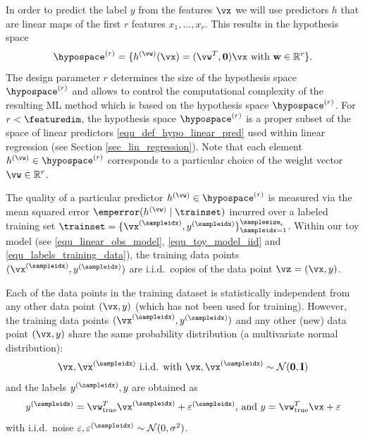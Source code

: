\documentclass[12pt]{report}
\begin{document}
In order to predict the label $y$ from the features $\vx$ we will use 
predictors $h$ that are linear maps of the first $r$ features $x_{1},\ldots,x_{r}$. 
This results in the hypothesis space 
\vspace*{-2mm}
\begin{equation}
\label{equ_generalization_hypospace_r}
\hypospace^{(r)} = \{ h^{(\vw)}(\vx)= (\vw^{T},\mathbf{0}) \vx \mbox{ with } \mathbf{w} \in \mathbb{R}^{r} \}.   
\vspace*{-1mm}
\end{equation}
The design parameter $r$ determines the size of the hypothesis space 
$\hypospace^{(r)}$ and allows to control the computational complexity 
of the resulting ML method which is based on the hypothesis space 
$\hypospace^{(r)}$. For $r < \featuredim$, the hypothesis space $\hypospace^{(r)}$ 
is a proper subset of the space of linear predictors \eqref{equ_def_hypo_linear_pred} 
used within linear regression (see Section \ref{sec_lin_regression}). Note that 
each element $h^{(\vw)} \in \hypospace^{(r)}$ corresponds to a particular 
choice of the weight vector $\vw \in \mathbb{R}^{r}$. 

The quality of a particular predictor $h^{(\vw)} \in \hypospace^{(r)}$ is measured 
via the mean squared error $\emperror (h^{(\vw)} \mid \trainset)$ incurred over a 
labeled training set $\trainset= \{ \vx^{(\sampleidx)}, y^{(\sampleidx)} \}_{\sampleidx=1}^{\samplesize_{\rm t}}$. 
Within our toy model (see \eqref{equ_linear_obs_model}, \eqref{equ_toy_model_iid} 
and \eqref{equ_labels_training_data}), the training data points $(\vx^{(\sampleidx)},y^{(\sampleidx)})$ 
are i.i.d.\ copies of the data point $\vz = (\vx,y)$. 

Each of the data points in the training dataset is statistically independent from 
any other data point $(\vx,y)$ (which has not been used for training). However, 
the training data points $(\vx^{(\sampleidx)},y^{(\sampleidx)})$ and any other (new) 
data point $(\vx,y)$ share the same probability distribution (a multivariate normal distribution): 
\begin{equation} 
\label{equ_toy_model_iid}
\vx, \vx^{(\sampleidx)} \mbox{ i.i.d. with } \vx, \vx^{(\sampleidx)} \sim \mathcal{N}(\mathbf{0}, \mathbf{I}) 
\end{equation} 
and the labels $y^{(\sampleidx)},y$ are obtained as 
\begin{equation} 
\label{equ_labels_training_data}
y^{(\sampleidx)} = \vw_{\rm true}^{T}  \vx^{(\sampleidx)} + \varepsilon^{(\sampleidx)}\mbox{, and } y = \vw_{\rm true}^{T}  \vx + \varepsilon
\end{equation}  
with i.i.d.\ noise $\varepsilon, \varepsilon^{(\sampleidx)} \sim \mathcal{N}(0,\sigma^{2})$. 
\end{document}
